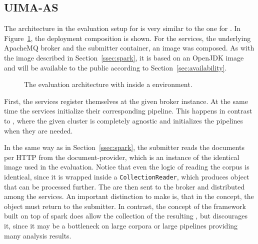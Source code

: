 \subsection{UIMA-AS}
The \docker{} architecture in the evaluation setup for \uimaas{} is very similar to the one for \spark{}. In Figure~\ref{fig:arch-uimaas}, the deployment composition is shown. For the \uimaas{} services, the underlying ApacheMQ broker and the submitter container, an \uimaas{} \docker{} image was composed. As with the \spark{} image described in Section~\ref{ssec:spark}, it is based on an OpenJDK image and will be available to the public according to Section~\ref{sec:availability}.
\begin{figure}[htb]
	\centering
	
	\caption[The evaluation architecture with UIMA-AS inside a Docker environment.]{The evaluation architecture with \uimaas{} inside a \docker{} environment.}
	\label{fig:arch-uimaas}
\end{figure}
First, the \uimaas{} services register themselves at the given broker instance. At the same time the services initialize their corresponding pipeline. This happens in contrast to \spark{}, where the given cluster is completely \uima{} agnostic and initializes the pipelines when they are needed.

In the same way as in Section~\ref{ssec:spark}, the submitter reads the documents per HTTP from the document-provider, which is an instance of the identical image used in the \spark{} evaluation. Notice that even the logic of reading the corpus is identical, since it is wrapped inside a \lstinline|CollectionReader|, which produces \cas{} object that can be processed further. The \cas{} are then sent to the broker and distributed among the services. An important distinction to make is, that in the \uimaas{} concept, the \cas{} object must return to the submitter. In contrast, the concept of the framework built on top of spark does allow the collection of the resulting \cas{}, but discourages it, since it may be a bottleneck on large corpora or large pipelines providing many analysis results.

